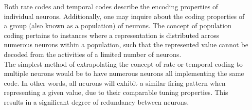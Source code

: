 



\noindent Both rate codes and temporal codes describe the encoding properties of individual neurons. Additionally, one may inquire about the coding properties of a group (also known as a population) of neurons. The concept of population coding pertains to instances where a representation is distributed across numerous neurons within a population, such that the represented value cannot be decoded from the activities of a limited number of neurons.\\

\noindent The simplest method of extrapolating the concept of rate or temporal coding to multiple neurons would be to have numerous neurons all implementing the same code. In other words, all neurons will exhibit a similar firing pattern when representing a given value, due to their comparable tuning properties. This results in a significant degree of redundancy between neurons. \\

